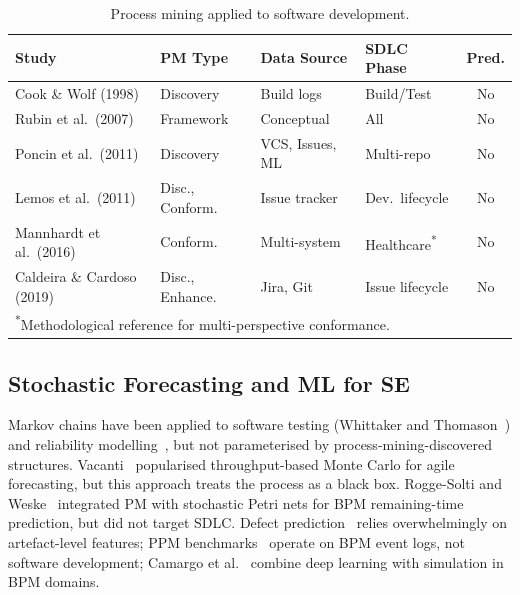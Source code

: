 \begin{table}[htbp]
\centering
\caption{Process mining applied to software development.}
\label{tab:pm-sd}
\small
\begin{tabular}{p{4.0cm}p{2.5cm}p{2.2cm}p{2.0cm}c}
\toprule
\textbf{Study} & \textbf{PM Type} & \textbf{Data Source} &
\textbf{SDLC Phase} & \textbf{Pred.} \\
\midrule
Cook \& Wolf (1998)            & Discovery       & Build logs       & Build/Test     & No \\
Rubin et al.\ (2007)            & Framework       & Conceptual       & All            & No \\
Poncin et al.\ (2011)           & Discovery       & VCS, Issues, ML  & Multi-repo     & No \\
Lemos et al.\ (2011)            & Disc., Conform. & Issue tracker    & Dev.\ lifecycle & No \\
Mannhardt et al.\ (2016)        & Conform.        & Multi-system     & Healthcare\textsuperscript{*} & No \\
Caldeira \& Cardoso (2019)     & Disc., Enhance. & Jira, Git        & Issue lifecycle & No \\
\bottomrule
\multicolumn{5}{l}{\textsuperscript{*}\scriptsize{Methodological reference for multi-perspective conformance.}}
\end{tabular}
\end{table}

\subsection{Stochastic Forecasting and ML for SE}

Markov chains have been applied to software testing
(Whittaker and Thomason~\cite{WhittakerThomason1994}) and reliability
modelling~\cite{WhittakerRekabThomason2000}, but not parameterised by
process-mining-discovered structures.
Vacanti~\cite{vacanti2015} popularised throughput-based Monte Carlo for
agile forecasting, but this approach treats the process as a black box.
Rogge-Solti and Weske~\cite{RoggeSolti2015NonMarkovianSPN} integrated PM
with stochastic Petri nets for BPM remaining-time prediction, but did not
target SDLC. Defect prediction~\cite{Zimmermann2005MiningVersionHistories,
Wahono2015, pachouly2022} relies overwhelmingly on artefact-level
features; PPM benchmarks~\cite{tax2017, marquezChamorro2018} operate on
BPM event logs, not software development; Camargo et
al.~\cite{camargo2022learning} combine deep learning with simulation in
BPM domains.

